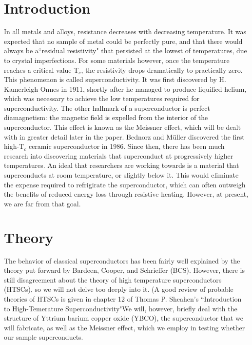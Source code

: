 \documentclass[aps,prl,twocolumn,groupedaddress]{revtex4}
\begin{document}
\section{Introduction}
In all metals and alloys, resistance decreases with decreasing temperature. It was expected that no sample of metal could be perfectly pure, and that there would always be a``residual resistivity" that persisted at the lowest of temperatures, due to crystal imperfections.\cite{rose} For some materials however, once the temperature reaches a critical value T$_{c}$, the resistivity drops dramatically to practically zero. This phenomenon is called superconductivity. It was first discovered by H. Kamerleigh Onnes in 1911\cite{onnes}, shortly after he managed to produce liquified helium, which was necessary to achieve the low temperatures required for superconductivity. The other hallmark of a superconductor is perfect diamagnetism: the magnetic field is expelled from the interior of the superconductor.\cite{tinkman} This effect is known as the Meissner effect, which will be dealt with in greater detail later in the paper. Bednorz and M\"{u}ller discovered the first high-T$_{c}$ ceramic superconductor in 1986.\cite{bednorz} Since then, there has been much research into discovering materials that superconduct at progressively higher temperatures. An ideal that researchers are working towards is a material that superconducts at room temperature, or slightly below it. This would eliminate the expense required to refrigirate the superconductor, which can often outweigh the benefits of reduced energy loss through resistive heating. However, at present, we are far from that goal.
\section{Theory}
The behavior of classical superconductors has been fairly well explained by the theory put forward by Bardeen, Cooper, and Schrieffer (BCS)\cite{bcs}. However, there is still disagreement about the theory of high temperature superconductors (HTSCs), so we will not delve too deeply into it. (A good review of probable theories of HTSCs is given in chapter 12 of Thomas P. Sheahen's ``Introduction to High-Temerature Superconductivity"\cite{sheahen}We will, however, briefly deal with the structure of Yttrium barium copper oxide (YBCO), the superconductor that we will fabricate, as well as the Meissner effect, which we employ in testing whether our sample superconducts.
\end{document}
